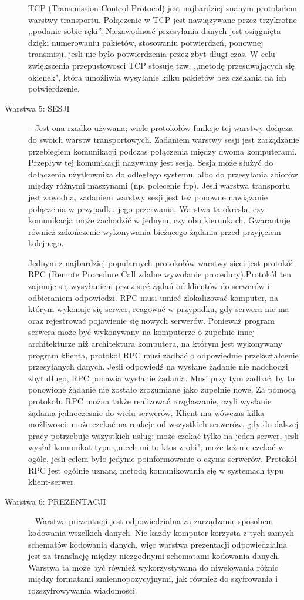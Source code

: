 \documentclass[a4paper,11pt]{article}
\begin{document}
\begin{description}
TCP (Transmission Control Protocol) jest najbardziej znanym protokołem warstwy transportu. Połączenie w TCP jest nawiązywane przez trzykrotne ,,podanie sobie ręki''. Niezawodnosć przesyłania danych jest osiągnięta dzięki numerowaniu pakietów, stosowaniu potwierdzeń, ponownej transmisji, jesli nie było potwierdzenia przez zbyt długi czas. W celu zwiększenia przepustowosci TCP stosuje tzw. ,,metodę przesuwających się okienek", która umożliwia wysyłanie kilku pakietów bez czekania na ich potwierdzenie.
\item[Warstwa 5: SESJI] -- Jest ona rzadko używana; wiele protokołów funkcje tej warstwy dołącza do swoich warstw transportowych. Zadaniem warstwy sesji jest zarządzanie przebiegiem komunikacji podczas połączenia między dwoma komputerami. Przepływ tej komunikacji nazywany jest sesją. Sesja może służyć do dołączenia użytkownika do odległego systemu, albo do przesyłania zbiorów między różnymi maszynami (np. polecenie ftp). Jesli warstwa transportu jest zawodna, zadaniem warstwy sesji jest też ponowne nawiązanie połączenia w przypadku jego przerwania. Warstwa ta okresla, czy komunikacja może zachodzić w jednym, czy obu kierunkach. Gwarantuje również zakończenie wykonywania bieżącego żądania przed przyjęciem kolejnego.

Jednym z najbardziej popularnych protokołów warstwy sieci jest protokół RPC (Remote Procedure Call  zdalne wywołanie procedury).Protokół ten zajmuje się wysyłaniem przez sieć żądań od klientów do serwerów i odbieraniem odpowiedzi. RPC musi umieć zlokalizować komputer, na którym wykonuje się serwer, reagować w przypadku, gdy serwera nie ma oraz rejestrować pojawienie się nowych serwerów. Ponieważ program serwera może być wykonywany na komputerze o zupełnie innej architekturze niż architektura komputera, na którym jest wykonywany program klienta, protokół RPC musi zadbać o odpowiednie przekształcenie przesyłanych danych.  Jesli odpowiedź na wysłane żądanie nie nadchodzi zbyt długo, RPC ponawia wysłanie żądania. Musi przy tym zadbać, by to ponowione żądanie nie zostało zrozumiane jako zupełnie nowe. Za pomocą protokołu RPC można także realizować rozgłaszanie, czyli wysłanie żądania jednoczesnie do wielu serwerów. Klient ma wówczas kilka możliwosci: może czekać na reakcje od wszystkich serwerów, gdy do dalszej pracy potrzebuje wszystkich usług; może czekać tylko na jeden serwer, jesli wysłał komunikat typu ,,niech mi to ktos zrobi"; może też nie czekać w ogóle, jesli celem było jedynie poinformowanie o czyms serwerów. Protokół RPC jest ogólnie uznaną metodą komunikowania się w systemach typu klient-serwer.  
\item[Warstwa 6: PREZENTACJI] -- Warstwa prezentacji jest odpowiedzialna za zarządzanie sposobem kodowania wszelkich danych. Nie każdy komputer korzysta z tych samych schematów kodowania danych, więc warstwa prezentacji odpowiedzialna jest za translację między niezgodnymi schematami kodowania danych. Warstwa ta może być również wykorzystywana do niwelowania różnic między formatami zmiennopozycyjnymi, jak również do szyfrowania i rozszyfrowywania wiadomosci.


\end{description}
\end{document}

